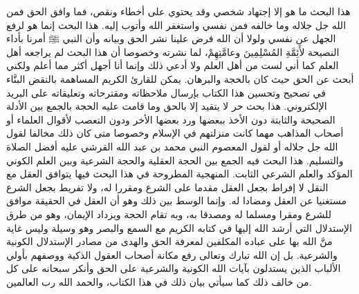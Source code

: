 هذا البحث ما هو إلا إجتهاد شخصي وقد يحتوي على أخطاء ونقص، فما وافق الحق فمن الله جل جلاله وما خالفه فمن نفسي واستغفر الله وأتوب إليه. هذا البحث إنما هو لرفع الجهل عن نفسي ولولا أن الله فرض علينا نشر الحق وبيانه وأن النبي ﷺ أمرنا بأداء النصيحة لأَئِمَّةِ المُسْلِمِينَ وعامَّتِهِمْ، لما نشرته وخصوصا أن هذا البحث لم يراجعه أهل العلم كما أني لست من أهل العلم ولا أدعي ذلك وإنما أنا أجهل أكثر مما أعلم ولكني أبحث عن الحق حيث كان بالحجة والبرهان. يمكن للقارئ الكريم المساهمة بالنقض البنَّاء في تصحيح وتحسين هذا الكتاب بإرسال ملاحظاته ومقترحاته وتعليقاته على البريد الإلكتروني. هذا بحث حر لا يتقيد إلا بالحق وما قامت عليه الحجة بالجمع بين الأدلة الصحيحة والثابتة دون الأخذ ببعضها ورد بعضها الأخر ودون التعصب لأقوال العلماء أو أصحاب المذاهب مهما كانت منزلتهم في الإسلام وخصوصا متى كان ذلك مخالفا لقول الله جل جلاله أو لقول المعصوم النبي محمد بن عبد الله القرشي عليه أفضل الصلاة والتسليم. هذا البحث فيه الجمع بين الحجة العقلية والحجة الشرعية وبين العلم الكوني المؤكد والعلم الشرعي الثابت. المنهجية المطروحة في هذا البحث فيها يتوافق العقل مع النقل لا إفراط بجعل العقل مقدما على الشرع ومقررا له، ولا تفريط بجعل الشرع مستغنيا عن العقل ومضادا له. وإنما الوسط بين ذلك وهو أن العقل في الحقيقة موافق للشرع ومقرا ومسلما له ومصدقا به، وبه تقام الحجة ويزداد الإيمان، وهو من طرق الإستدلال التي أرشد الله إليها في كتابه الكريم مع السمع والبصر وهو وسيلة وليس غاية منَّ الله بها على عباده المكلفين لمعرفة الحق والهدى من مصادر الإستدلال الكونية والشرعية. بل إن الله تبارك وتعالى رفع مكانة أصحاب العقول الذكية ووصفهم بأولي الألباب الذين يستدلون بآيات الله الكونية والشرعية على الحق وأنكر سبحانه على كل من خالف ذلك كما سيأتي بيان ذلك في هذا الكتاب، والحمد الله رب العالمين.
